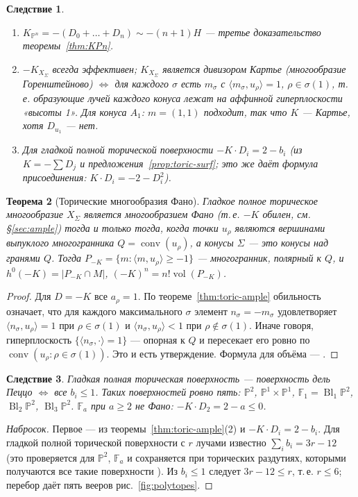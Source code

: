 \documentclass[11pt,a4paper]{article}
\theoremstyle{plain}
\newtheorem{theorem}{Теорема}[section]
\newtheorem{corollary}[theorem]{Следствие}
\theoremstyle{definition}
\theoremstyle{remark}
\newcommand{\PP}{\mathbb{P}}
\DeclareMathOperator{\Bl}{Bl}
\DeclareMathOperator{\conv}{conv}
\DeclareMathOperator{\vol}{vol}
\begin{document}
\begin{corollary}
\begin{enumerate}
\item $K_{\PP^n}=-(D_0+\dots+D_n)\sim-(n+1)H$ --- третье доказательство теоремы~\ref{thm:KPn}.
\item $-K_{X_\Sigma}$ всегда эффективен; $K_{X_\Sigma}$ является дивизором Картье (многообразие
\emph{Горенштейново}) $\iff$ для каждого $\sigma$ есть $m_\sigma$ с $\langle m_\sigma,u_\rho\rangle=1$,
$\rho\in\sigma(1)$, т.\,е. образующие лучей каждого конуса лежат на аффинной гиперплоскости «высоты 1».
Для конуса $A_1$: $m=(1,1)$ подходит, так что $K$ --- Картье, хотя $D_{u_1}$ --- нет.
\item Для гладкой полной торической поверхности $-K\cdot D_i=2-b_i$ (из $K=-\sum D_j$ и
предложения~\ref{prop:toric-surf}; это же даёт формула присоединения: $K\cdot D_i=-2-D_i^2$).
\end{enumerate}
\end{corollary}

\begin{theorem}[Торические многообразия Фано]\label{thm:toric-Fano}
Гладкое полное торическое многообразие $X_\Sigma$ является многообразием Фано (т.\,е. $-K$ обилен, см.
\S\ref{sec:ample}) тогда и только тогда, когда точки $u_\rho$ являются вершинами выпуклого многогранника
$Q=\conv(u_\rho)$, а конусы $\Sigma$ --- это конусы над гранями $Q$. Тогда
$P_{-K}=\{m:\langle m,u_\rho\rangle\ge-1\}$ --- многогранник, полярный к $Q$, и
$h^0(-K)=|P_{-K}\cap M|$, $(-K)^n=n!\vol(P_{-K})$.
\end{theorem}
\begin{proof}
Для $D=-K$ все $a_\rho=1$. По теореме~\ref{thm:toric-ample} обильность означает, что для
каждого максимального $\sigma$ элемент $n_\sigma=-m_\sigma$ удовлетворяет $\langle n_\sigma,u_\rho\rangle=1$
при $\rho\in\sigma(1)$ и $\langle n_\sigma,u_\rho\rangle<1$ при $\rho\notin\sigma(1)$. Иначе говоря,
гиперплоскость $\{\langle n_\sigma,\cdot\rangle=1\}$ --- опорная к $Q$ и пересекает его ровно по
$\conv(u_\rho:\rho\in\sigma(1))$. Это и есть утверждение. Формула для объёма --- \cite[13.4.3]{CLS}.
\end{proof}

\begin{corollary}
Гладкая полная торическая поверхность --- поверхность дель Пеццо $\iff$ все $b_i\le1$. Таких поверхностей
ровно пять: $\PP^2$, $\PP^1\times\PP^1$, $\mathbb F_1=\Bl_1\PP^2$, $\Bl_2\PP^2$, $\Bl_3\PP^2$.
$\mathbb F_a$ при $a\ge2$ не Фано: $-K\cdot D_2=2-a\le0$.
\end{corollary}
\begin{proof}[Набросок]
Первое --- из теоремы~\ref{thm:toric-ample}(2) и $-K\cdot D_i=2-b_i$. Для гладкой полной торической
поверхности с $r$ лучами известно $\sum_i b_i=3r-12$ (это проверяется для $\PP^2$, $\mathbb F_a$ и
сохраняется при торических раздутиях, которыми получаются все такие поверхности \cite[10.4]{CLS}).
Из $b_i\le1$ следует $3r-12\le r$, т.\,е. $r\le6$; перебор даёт пять вееров рис.~\ref{fig:polytopes}.
\end{proof}
\end{document}
